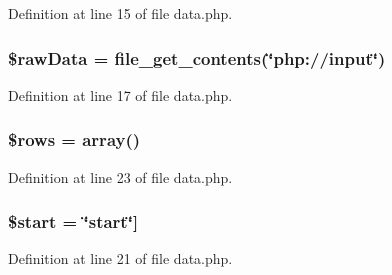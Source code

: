 \-Definition at line 15 of file data.\-php.

\hypertarget{administration_2practice_2data_8php_ad66cfed6c1f454fbc3f3c6fdc8842a7b}{
\subsubsection[{\$raw\-Data}]{\setlength{\rightskip}{0pt plus 5cm}\$raw\-Data = file\-\_\-get\-\_\-contents(\char`\"{}php\-://input\char`\"{})}}\label{administration_2practice_2data_8php_ad66cfed6c1f454fbc3f3c6fdc8842a7b}


\-Definition at line 17 of file data.\-php.

\hypertarget{administration_2practice_2data_8php_ace2ec39e7df3899fa8df9640ec274b03}{
\subsubsection[{\$rows}]{\setlength{\rightskip}{0pt plus 5cm}\$rows = array()}}\label{administration_2practice_2data_8php_ace2ec39e7df3899fa8df9640ec274b03}


\-Definition at line 23 of file data.\-php.

\hypertarget{administration_2practice_2data_8php_a50a00e7de77365e00b117e73aa82fb9b}{
\subsubsection[{\$start}]{\setlength{\rightskip}{0pt plus 5cm}\$start = \char`\"{}start\char`\"{}\mbox{]}}}\label{administration_2practice_2data_8php_a50a00e7de77365e00b117e73aa82fb9b}


\-Definition at line 21 of file data.\-php.

